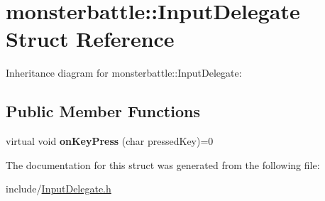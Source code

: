 \hypertarget{structmonsterbattle_1_1InputDelegate}{}\section{monsterbattle\+:\+:Input\+Delegate Struct Reference}
\label{structmonsterbattle_1_1InputDelegate}


Inheritance diagram for monsterbattle\+:\+:Input\+Delegate\+:
\subsection*{Public Member Functions}
\begin{DoxyCompactItemize}
\item 
\mbox{\label{structmonsterbattle_1_1InputDelegate_aed2865cef44e30313d7ddb0ca7310c80}} 
virtual void {\bfseries on\+Key\+Press} (char pressed\+Key)=0
\end{DoxyCompactItemize}


The documentation for this struct was generated from the following file\+:\begin{DoxyCompactItemize}
\item 
include/\hyperlink{InputDelegate_8h}{Input\+Delegate.\+h}\end{DoxyCompactItemize}

